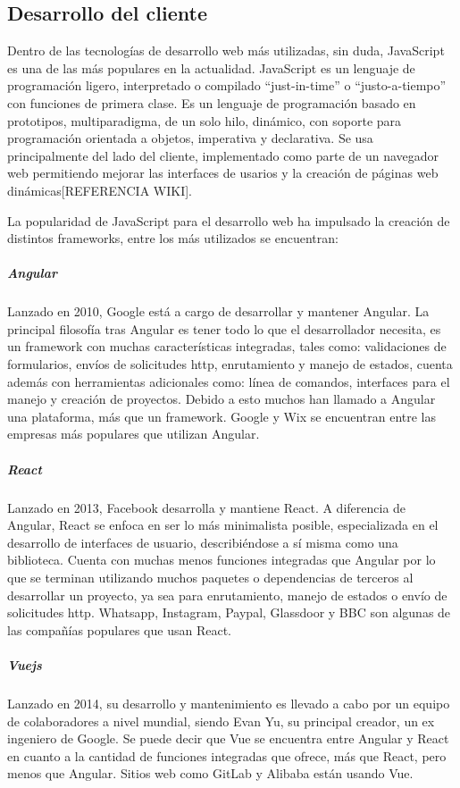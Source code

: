 \subsection{Desarrollo del cliente}
Dentro de las tecnologías de desarrollo web más utilizadas, sin duda, 
JavaScript es una de las más populares en la actualidad. JavaScript es 
un lenguaje de programación ligero, interpretado o compilado ``just-in-time''
o ``justo-a-tiempo'' con funciones de primera clase. Es un lenguaje de programación
basado en prototipos, multiparadigma, de un solo hilo, dinámico, con
soporte para programación orientada a objetos, imperativa y declarativa.
Se usa principalmente del lado del cliente, implementado como parte de un navegador 
web permitiendo mejorar las interfaces de usarios y la creación de
páginas web dinámicas[REFERENCIA WIKI].

La popularidad de JavaScript para el desarrollo web ha impulsado
la creación de distintos frameworks, entre los más 
utilizados se encuentran:

\subparagraph{Angular}
Lanzado en 2010, Google está a cargo de desarrollar y 
mantener Angular. La principal filosofía tras Angular es 
tener todo lo que el desarrollador necesita, es un framework
con muchas características integradas, tales como: validaciones 
de formularios, envíos de solicitudes http, enrutamiento y 
manejo de estados, cuenta además con herramientas adicionales
como: línea de comandos, interfaces para el manejo y 
creación de proyectos. Debido a esto muchos han llamado a Angular
una plataforma, más que un framework. Google y Wix se 
encuentran entre las empresas más populares que utilizan
Angular.

\subparagraph{React}
Lanzado en 2013, Facebook desarrolla y mantiene React.
A diferencia de Angular, React se enfoca en ser lo más minimalista posible,
especializada en el desarrollo de interfaces de usuario, describiéndose
a sí misma como una biblioteca. Cuenta con muchas menos funciones integradas
que Angular por lo que se terminan utilizando muchos paquetes o
dependencias de terceros al desarrollar un proyecto, ya sea para enrutamiento, manejo de estados o
envío de solicitudes http.
Whatsapp, Instagram, Paypal, Glassdoor y BBC son algunas de 
las compañías populares que usan React.

\subparagraph{Vuejs}
Lanzado en 2014, su desarrollo y mantenimiento es llevado a 
cabo por un equipo de colaboradores a nivel mundial, siendo  
Evan Yu, su principal creador, un ex ingeniero de Google.
Se puede decir que Vue se encuentra entre Angular y React en cuanto 
a la cantidad de funciones integradas que ofrece, más que React, pero 
menos que Angular. Sitios web como GitLab y Alibaba están usando Vue. \\






